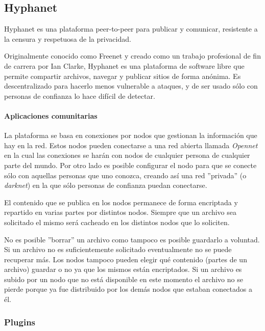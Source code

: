\subsection{Hyphanet}

Hyphanet \cite{hyphanet} es una plataforma peer-to-peer para publicar y comunicar, resistente a la censura y respetuosa de la privacidad.

Originalmente conocido como Freenet y creado como un trabajo profesional de fin de carrera por Ian Clarke, Hyphanet es una plataforma de software libre que permite compartir archivos, navegar y publicar sitios de forma anónima. Es descentralizado para hacerlo menos vulnerable a ataques, y de ser usado sólo con personas de confianza lo hace difícil de detectar.

\paragraph{Aplicaciones comunitarias}

La plataforma se basa en conexiones por nodos que gestionan la información que hay en la red. Estos nodos pueden conectarse a una red abierta llamada \textit{Opennet} en la cual las conexiones se harán con nodos de cualquier persona de cualquier parte del mundo. Por otro lado es posible configurar el nodo para que se conecte sólo con aquellas personas que uno conozca, creando así una red ''privada'' (o \textit{darknet}) en la que sólo personas de confianza puedan conectarse.

El contenido que se publica en los nodos permanece de forma encriptada y repartido en varias partes por distintos nodos. Siempre que un archivo sea solicitado el mismo será cacheado en los distintos nodos que lo soliciten.

No es posible ''borrar'' un archivo como tampoco es posible guardarlo a voluntad. Si un archivo no es suficientemente solicitado eventualmente no se puede recuperar más. Los nodos tampoco pueden elegir qué contenido (partes de un archivo) guardar o no ya que los mismos están encriptados. Si un archivo es subido por un nodo que no está disponible en este momento el archivo no se pierde porque ya fue distribuido por los demás nodos que estaban conectados a él.


\subsubsection{Plugins}

